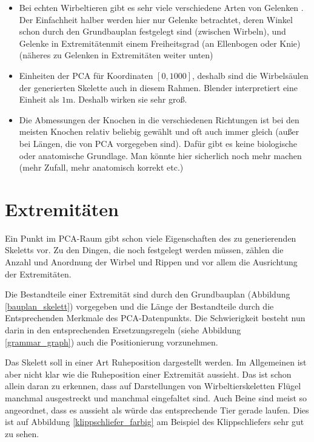 \begin{itemize}
 \item Bei echten Wirbeltieren gibt es sehr viele verschiedene Arten von Gelenken \cite[Absatz 21.5.2]{Vergleichende_Anatomie}. Der Einfachheit halber werden hier nur Gelenke betrachtet, deren Winkel schon durch den Grundbauplan festgelegt sind (\zb zwischen Wirbeln), und Gelenke in Extremitätenmit einem Freiheitsgrad (\zb an Ellenbogen oder Knie) (näheres zu Gelenken in Extremitäten weiter unten)

 \item Einheiten der PCA für Koordinaten $[0, 1000]$, deshalb sind die Wirbelsäulen der generierten Skelette auch in diesem Rahmen. Blender interpretiert eine Einheit als $1$m. Deshalb wirken sie sehr groß.
 
 \item Die Abmessungen der Knochen in die verschiedenen Richtungen ist bei den meisten Knochen relativ beliebig gewählt und oft auch immer gleich (außer bei Längen, die von PCA vorgegeben sind). Dafür gibt es keine biologische oder anatomische Grundlage. Man könnte hier sicherlich noch mehr machen (mehr Zufall, mehr anatomisch korrekt etc.)
\end{itemize}

\section{Extremitäten}
\label{section:extremity_generation}

Ein Punkt im PCA-Raum gibt schon viele Eigenschaften des zu generierenden Skeletts vor. Zu den Dingen, die noch festgelegt werden müssen, zählen \zb die Anzahl und Anordnung der Wirbel und Rippen und vor allem die Ausrichtung der Extremitäten. 

Die Bestandteile einer Extremität sind durch den Grundbauplan (Abbildung \ref{bauplan_skelett}) vorgegeben und die Länge der Bestandteile durch die Entsprechenden Merkmale des PCA-Datenpunkts. Die Schwierigkeit besteht nun darin in den entsprechenden Ersetzungsregeln (siehe Abbildung \ref{grammar_graph}) auch die Positionierung vorzunehmen.

Das Skelett soll in einer Art Ruheposition dargestellt werden. Im Allgemeinen ist aber nicht klar wie die Ruheposition einer Extremität aussieht. Das ist schon allein daran zu erkennen, dass auf Darstellungen von Wirbeltierskeletten Flügel manchmal ausgestreckt und manchmal eingefaltet sind. Auch Beine sind meist so angeordnet, dass es aussieht als würde das entsprechende Tier gerade laufen. Dies ist auf Abbildung \ref{klippschliefer_farbig} am Beispiel des Klippschliefers sehr gut zu sehen.

